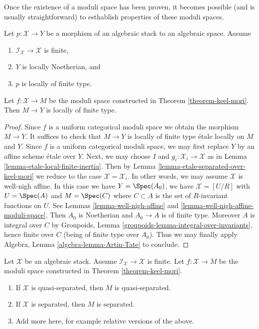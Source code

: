 \noindent
Once the existence of a moduli space has been proven,
it becomes possible (and is usually straightforward) to
esthablish properties of these moduli spaces.

\begin{lemma}
\label{lemma-keel-mori-finite-type}
Let $p : \mathcal{X} \to Y$ be a morphism of an algebraic stack to an
algebraic space. Assume
\begin{enumerate}
\item $\mathcal{I}_\mathcal{X} \to \mathcal{X}$ is finite,
\item $Y$ is locally Noetherian, and
\item $p$ is locally of finite type.
\end{enumerate}
Let $f : \mathcal{X} \to M$ be the moduli space constructed in
Theorem \ref{theorem-keel-mori}.
Then $M \to Y$ is locally of finite type.
\end{lemma}

\begin{proof}
Since $f$ is a uniform categorical moduli space we obtain the
morphism $M \to Y$. It suffices to check that $M \to Y$
is locally of finite type \'etale locally on $M$ and $Y$.
Since $f$ is a uniform categorical moduli space, we
may first replace $Y$ by an affine scheme \'etale over $Y$.
Next, we may choose $I$ and $g_i : \mathcal{X}_i \to \mathcal{X}$
as in Lemma \ref{lemma-etale-local-finite-inertia}.
Then by Lemma \ref{lemma-etale-separated-over-keel-mori}
we reduce to the case $\mathcal{X} = \mathcal{X}_i$.
In other words, we may assume $\mathcal{X}$ is well-nigh affine.
In this case we have $Y = \Spec(A_0)$, we have
$\mathcal{X} = [U/R]$ with $U = \Spec(A)$ and
$M = \Spec(C)$ where $C \subset A$ is the set of $R$-invariant
functions on $U$. See
Lemmas \ref{lemma-well-nigh-affine} and
\ref{lemma-well-nigh-affine-moduli-space}.
Then $A_0$ is Noetherian and $A_0 \to A$ is of finite type.
Moreover $A$ is integral over $C$ by
Groupoids, Lemma \ref{groupoids-lemma-integral-over-invariants},
hence finite over $C$
(being of finite type over $A_0$).
Thus we may finally apply
Algebra, Lemma \ref{algebra-lemma-Artin-Tate}
to conclude.
\end{proof}

\begin{lemma}
\label{lemma-keel-mori-diagonal}
Let $\mathcal{X}$ be an algebraic stack. Assume
$\mathcal{I}_\mathcal{X} \to \mathcal{X}$ is finite.
Let $f : \mathcal{X} \to M$ be the moduli space constructed in
Theorem \ref{theorem-keel-mori}.
\begin{enumerate}
\item If $\mathcal{X}$ is quasi-separated, then $M$ is quasi-separated.
\item If $\mathcal{X}$ is separated, then $M$ is separated.
\item Add more here, for example relative versions of the above.
\end{enumerate}
\end{lemma}

